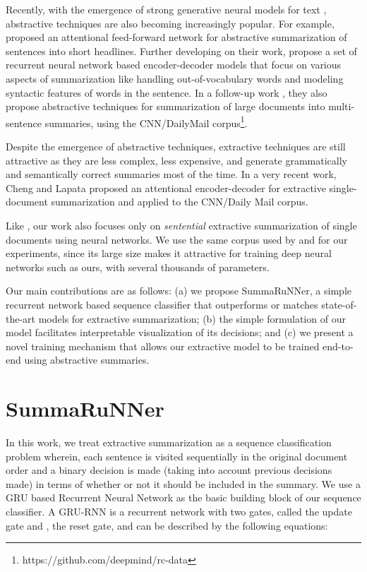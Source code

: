 \documentclass[letterpaper]{article}
\begin{document}
Recently, with the emergence of strong generative neural models for text \cite{bahdanau:14}, abstractive techniques are also becoming increasingly popular. For example, \cite{rush:15} proposed an attentional feed-forward network for abstractive summarization of sentences into short headlines. Further developing on their work, \cite{nallapati} propose a set of recurrent neural network based encoder-decoder models that focus on various aspects of summarization like handling out-of-vocabulary words and modeling syntactic features of words in the sentence. In a follow-up work \cite{nallapati_conll}, they also propose abstractive techniques for summarization of large documents into multi-sentence summaries, using the CNN/DailyMail corpus\footnote{https://github.com/deepmind/rc-data}.

Despite the emergence of abstractive techniques, extractive techniques are still attractive as they are less complex, less expensive, and generate grammatically and semantically correct summaries most of the time. In a very recent work, Cheng and Lapata  proposed an attentional encoder-decoder for extractive single-document summarization and applied to the CNN/Daily Mail corpus.  


Like \cite{jianpeng}, our work also focuses only on {\it sentential} extractive summarization of single documents using neural networks. We use the same corpus used by \cite{nallapati_conll} and \cite{jianpeng} for our experiments, since its large size makes it attractive for training deep neural networks such as ours, with several thousands of parameters. 

Our main contributions are as follows: (a) we propose SummaRuNNer, a simple recurrent network based sequence classifier that outperforms or matches state-of-the-art models for extractive summarization; (b) the simple formulation of our model facilitates interpretable visualization of its decisions; and (c) we present a novel training mechanism that allows our extractive model to be trained end-to-end using abstractive summaries.  


\section{SummaRuNNer}
In this work, we treat extractive summarization as a sequence classification problem wherein, each sentence is visited sequentially in the original document order and a binary decision is made (taking into account previous decisions made) in terms of whether or not it should be included in the summary. We use a GRU based Recurrent Neural Network \cite{gru_rnn} as the basic building block of our sequence classifier. A GRU-RNN is a recurrent network with two gates,  called the update gate and  , the reset gate, and can be described by the following equations:
\end{document}
